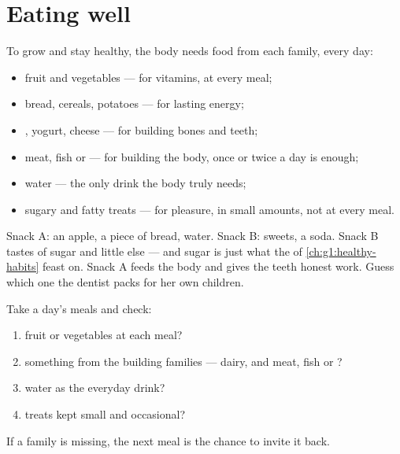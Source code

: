 \section{Eating well}

\begin{proposition}\label{prop:g2:teeth-and-eating-well:balanced}
To grow and stay healthy, the body needs food from each family,
every day:
\begin{itemize}
  \item fruit and vegetables --- for vitamins, at every meal;
  \item bread, cereals, potatoes --- for lasting energy;
  \item {}, yogurt, cheese --- for building bones and teeth;
  \item meat, fish or  --- for building the body, once or
        twice a day is enough;
  \item water --- the only drink the body truly needs;
  \item sugary and fatty treats --- for pleasure, in small
        amounts, not at every meal.
\end{itemize}
\end{proposition}
\admitted

\begin{example}\label{ex:g2:teeth-and-eating-well:snack}
Snack A: an apple, a piece of bread, water. Snack B: sweets, a
soda. Snack B tastes of sugar and little else --- and sugar is
just what the  of \cref{ch:g1:healthy-habits} feast on.
Snack A feeds the body and gives the teeth honest work. Guess
which one the dentist packs for her own children.
\end{example}

\begin{method}\label{met:g2:teeth-and-eating-well:check}
Take a day's meals and check:
\begin{enumerate}
  \item fruit or vegetables at each meal?
  \item something from the building families --- dairy, and meat,
        fish or ?
  \item water as the everyday drink?
  \item treats kept small and occasional?
\end{enumerate}
If a family is missing, the next meal is the chance to invite it
back.
\end{method}

